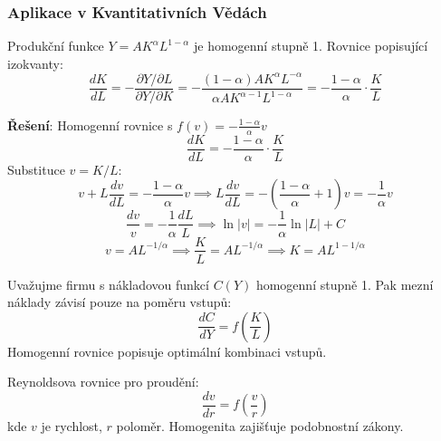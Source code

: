 \vspace{0.8\baselineskip}

\subsubsection{Aplikace v Kvantitativních Vědách}
\label{subsubsec:aplikace-kvantitativni-homog}

\begin{application}
\label{app:cobb-douglas}
Produkční funkce $Y = AK^\alpha L^{1-\alpha}$ je homogenní stupně 1. Rovnice popisující izokvanty:
\[
\frac{dK}{dL} = -\frac{\partial Y/\partial L}{\partial Y/\partial K} = -\frac{(1-\alpha)AK^\alpha L^{-\alpha}}{\alpha AK^{\alpha-1}L^{1-\alpha}} = -\frac{1-\alpha}{\alpha}\cdot\frac{K}{L}
\]

\textbf{Řešení}: Homogenní rovnice s $f(v) = -\frac{1-\alpha}{\alpha}v$
\[
\frac{dK}{dL} = -\frac{1-\alpha}{\alpha}\cdot\frac{K}{L}
\]
Substituce $v = K/L$:
\[
v + L\frac{dv}{dL} = -\frac{1-\alpha}{\alpha}v \implies L\frac{dv}{dL} = -\left(\frac{1-\alpha}{\alpha} + 1\right)v = -\frac{1}{\alpha}v
\]
\[
\frac{dv}{v} = -\frac{1}{\alpha}\frac{dL}{L} \implies \ln|v| = -\frac{1}{\alpha}\ln|L| + C
\]
\[
v = AL^{-1/\alpha} \implies \frac{K}{L} = AL^{-1/\alpha} \implies K = AL^{1-1/\alpha}
\]
\end{application}

\vspace{0.6\baselineskip}

\begin{application}
\label{app:konstantni-vynosy}
Uvažujme firmu s nákladovou funkcí $C(Y)$ homogenní stupně 1. Pak mezní náklady závisí pouze na poměru vstupů:
\[
\frac{dC}{dY} = f\left(\frac{K}{L}\right)
\]
Homogenní rovnice popisuje optimální kombinaci vstupů.
\end{application}

\vspace{0.6\baselineskip}

\begin{application}
\label{app:podobnostni-zakony}
Reynoldsova rovnice pro proudění:
\[
\frac{dv}{dr} = f\left(\frac{v}{r}\right)
\]
kde $v$ je rychlost, $r$ poloměr. Homogenita zajišťuje podobnostní zákony.
\end{application}

\vspace{0.8\baselineskip}


